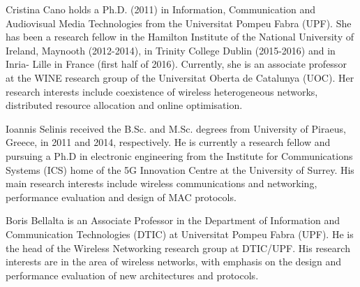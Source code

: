 \documentclass{ieeeaccess}
\begin{document}
\begin{IEEEbiography}{Cristina Cano} holds a Ph.D. (2011) in Information, Communication and Audiovisual Media Technologies from the Universitat Pompeu Fabra (UPF). She has been a research fellow in the Hamilton Institute of the National University of Ireland, Maynooth (2012-2014), in Trinity College Dublin (2015-2016) and in Inria- Lille in France (first half of 2016). Currently, she is an associate professor at the WINE research group of the Universitat Oberta de Catalunya (UOC). Her research interests include coexistence of wireless heterogeneous networks, distributed resource allocation and online optimisation. 
\end{IEEEbiography}

\begin{IEEEbiography}{Ioannis Selinis} received the B.Sc. and M.Sc. degrees from University of Piraeus, Greece, in 2011 and 2014, respectively. He is currently a research fellow and pursuing a Ph.D in electronic engineering from the Institute for Communications Systems (ICS) home of the 5G Innovation Centre at the University of Surrey. His main research interests include wireless communications and networking, performance evaluation and design of MAC protocols.
\end{IEEEbiography}

\begin{IEEEbiography}{Boris Bellalta} is an Associate Professor in the Department of Information and Communication Technologies (DTIC) at Universitat Pompeu Fabra (UPF). He is the head of the Wireless Networking research group at DTIC/UPF. His research interests are in the area of wireless networks, with emphasis on the design and performance evaluation of new architectures and protocols.
\end{IEEEbiography}

\EOD
\end{document}
